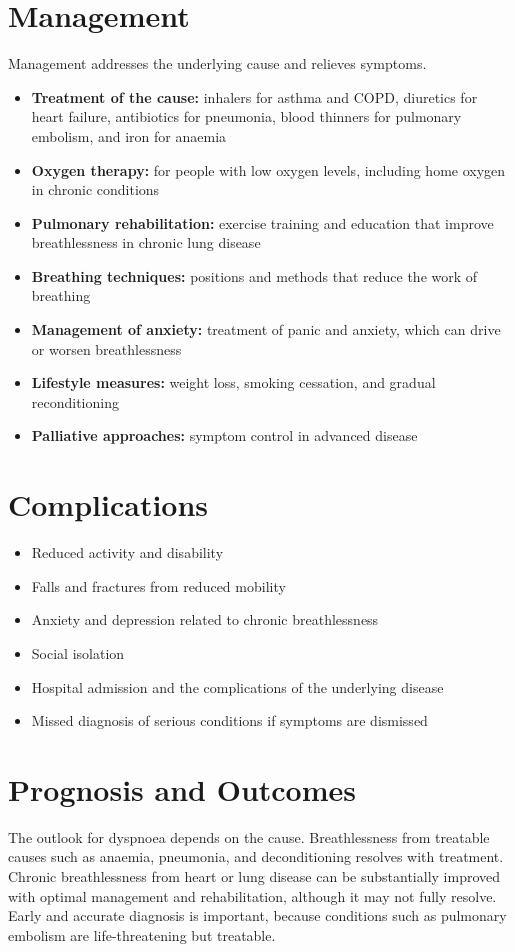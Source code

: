 \section*{Management}
Management addresses the underlying cause and relieves symptoms.
\begin{itemize}
    \item \textbf{Treatment of the cause:} inhalers for asthma and COPD, diuretics for heart failure, antibiotics for pneumonia, blood thinners for pulmonary embolism, and iron for anaemia
    \item \textbf{Oxygen therapy:} for people with low oxygen levels, including home oxygen in chronic conditions
    \item \textbf{Pulmonary rehabilitation:} exercise training and education that improve breathlessness in chronic lung disease
    \item \textbf{Breathing techniques:} positions and methods that reduce the work of breathing
    \item \textbf{Management of anxiety:} treatment of panic and anxiety, which can drive or worsen breathlessness
    \item \textbf{Lifestyle measures:} weight loss, smoking cessation, and gradual reconditioning
    \item \textbf{Palliative approaches:} symptom control in advanced disease
\end{itemize}

\section*{Complications}
\begin{itemize}
    \item Reduced activity and disability
    \item Falls and fractures from reduced mobility
    \item Anxiety and depression related to chronic breathlessness
    \item Social isolation
    \item Hospital admission and the complications of the underlying disease
    \item Missed diagnosis of serious conditions if symptoms are dismissed
\end{itemize}

\section*{Prognosis and Outcomes}
The outlook for dyspnoea depends on the cause. Breathlessness from treatable causes such as anaemia, pneumonia, and deconditioning resolves with treatment. Chronic breathlessness from heart or lung disease can be substantially improved with optimal management and rehabilitation, although it may not fully resolve. Early and accurate diagnosis is important, because conditions such as pulmonary embolism are life-threatening but treatable.

